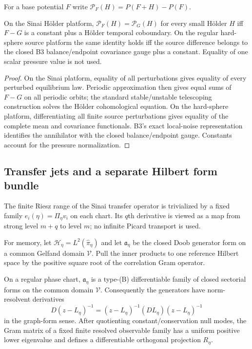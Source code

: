 For a base potential $F$ write
$\mathcal P_F(H)=P(F+H)-P(F)$.

\begin{theorem}
\label{thm:r12-c2-rigidity}
On the Sinai H\"older platform,
$\mathcal P_F(H)=\mathcal P_G(H)$ for every small H\"older $H$ iff
$F-G$ is a constant plus a H\"older temporal coboundary.  On the regular
hard-sphere source platform the same identity holds iff the source difference
belongs to the closed B3 balance/endpoint covariance gauge plus a constant.
Equality of one scalar pressure value is not used.
\end{theorem}

\begin{proof}
On the Sinai platform, equality of all perturbations gives equality of every
perturbed equilibrium law.  Periodic approximation then gives equal sums of
$F-G$ on all periodic orbits; the standard stable/unstable telescoping
construction solves the H\"older cohomological equation.  On the hard-sphere
platform, differentiating all finite source perturbations gives equality of
the complete mean and covariance functionals.  B3's exact local-noise
representation identifies the annihilator with the closed balance/endpoint
gauge.  Constants account for the pressure normalization.
\end{proof}

\subsection{Transfer jets and a separate Hilbert form bundle}

The finite Riesz range of the Sinai transfer operator is trivialized by a
fixed family $e_i(\eta)=\Pi_\eta v_i$ on each chart.  Its $q$th derivative is
viewed as a map from strong level $m+q$ to level $m$; no infinite Picard
transport is used.

For memory, let $\mathcal H_\eta=L^2(\widehat\pi_\eta)$ and let
$\mathfrak a_\eta$ be the closed Doob generator form on a common Gelfand domain
$\mathcal V$.  Pull the inner products to one reference Hilbert space by the
positive square root of the correlation Gram operator.

\begin{theorem}
\label{thm:r12-c2-form}
On a regular phase chart, $\mathfrak a_\eta$ is a type-(B) differentiable
family of closed sectorial forms on the common domain $\mathcal V$.
Consequently the generators have norm-resolvent derivatives
\[
 D(z-L_\eta)^{-1}
 =(z-L_\eta)^{-1}(DL_\eta)(z-L_\eta)^{-1}
\]
in the graph-form sense.  After quotienting constant/conservation null modes,
the Gram matrix of a fixed finite resolved observable family has a uniform
positive lower eigenvalue and defines a differentiable orthogonal projection
$R_\eta$.
\end{theorem}

